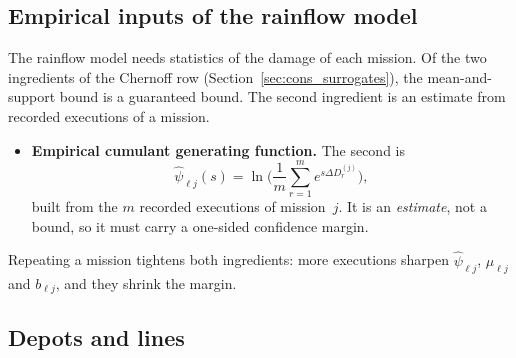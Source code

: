 \documentclass[11pt,a4paper]{article}
\theoremstyle{plain}
\theoremstyle{definition}
\theoremstyle{remark}
\begin{document}
\subsection{Empirical inputs of the rainflow model}

The rainflow model needs statistics of the damage of each mission.
Of the two ingredients of the Chernoff row (Section~\ref{sec:cons_surrogates}), the mean-and-support bound is a guaranteed bound.
The second ingredient is an estimate from recorded executions of a mission.
\begin{itemize}
  \item \textbf{Empirical cumulant generating function.} The second is
    \begin{equation}
      \widehat\psi_{\ell j}(s) = \ln\!\Big( \frac{1}{m} \sum_{r=1}^{m} e^{s \Delta D^{(j)}_r} \Big),
    \end{equation}
    built from the $m$ recorded executions of mission~$j$.
    It is an \emph{estimate}, not a bound, so it must carry a one-sided confidence margin.
\end{itemize}
Repeating a mission tightens both ingredients: more executions sharpen $\widehat\psi_{\ell j}$, $\mu_{\ell j}$ and $b_{\ell j}$, and they shrink the margin.

\subsection{Depots and lines}\label{sec:cs_depots}
\end{document}

